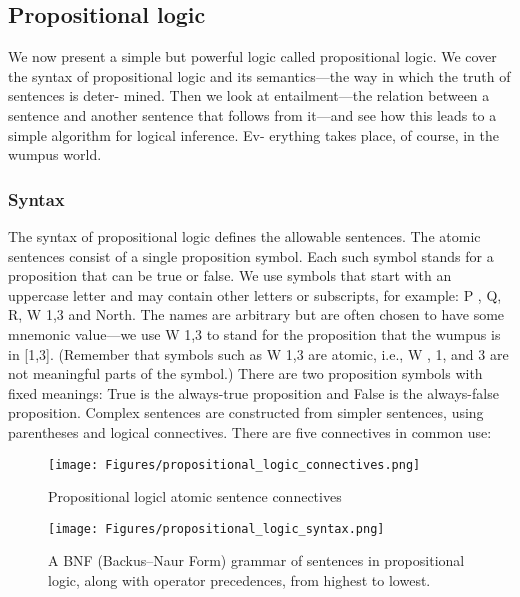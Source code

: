 \subsection{Propositional logic}


We now present a simple but powerful logic called propositional logic. We cover the syntax
of propositional logic and its semantics—the way in which the truth of sentences is deter-
mined. Then we look at entailment—the relation between a sentence and another sentence
that follows from it—and see how this leads to a simple algorithm for logical inference. Ev-
erything takes place, of course, in the wumpus world.

\subsubsection{Syntax}


The syntax of propositional logic defines the allowable sentences. The atomic sentences
consist of a single proposition symbol. Each such symbol stands for a proposition that can
be true or false. We use symbols that start with an uppercase letter and may contain other
letters or subscripts, for example: P , Q, R, W 1,3 and North. The names are arbitrary but
are often chosen to have some mnemonic value—we use W 1,3 to stand for the proposition
that the wumpus is in [1,3]. (Remember that symbols such as W 1,3 are atomic, i.e., W , 1,
and 3 are not meaningful parts of the symbol.) There are two proposition symbols with fixed
meanings: True is the always-true proposition and False is the always-false proposition.
Complex sentences are constructed from simpler sentences, using parentheses and logical
connectives. There are five connectives in common use:


\begin{figure}[H]
    \centering
    \texttt{[image: Figures/propositional\_logic\_connectives.png]}
    \caption{Propositional logicl atomic sentence connectives}
    \label{fig:connectives}
\end{figure}


\begin{figure}[H]
    \centering
    \texttt{[image: Figures/propositional\_logic\_syntax.png]}
    \caption{A BNF (Backus–Naur Form) grammar of sentences in propositional logic,
along with operator precedences, from highest to lowest.}
    \label{fig:connectives}
\end{figure}

